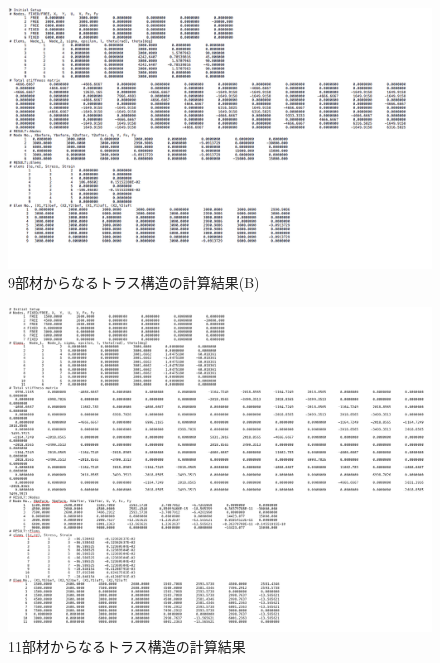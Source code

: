 \documentclass[a4paper,11pt,uplatex]{jsarticle}
\begin{document}
\begin{figure}[H]
  \begin{center}
    \includegraphics[width = 14cm]{画像/9b.png}
    \caption{9部材からなるトラス構造の計算結果(B)}
    \label{9部材結果B}
  \end{center}
\end{figure}

\begin{figure}[H]
  \begin{center}
    \includegraphics[width = 14cm]{画像/11result.png}
    \caption{11部材からなるトラス構造の計算結果}
    \label{11部材結果}
  \end{center}
\end{figure}
\end{document}
